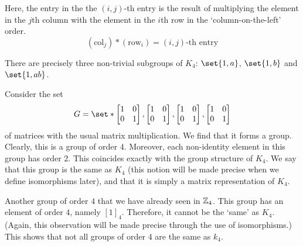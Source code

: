\documentclass[11pt]{penrose}
\begin{document}
Here, the entry in the the $(i,j)$-th entry is the result of multiplying the element in the $j$th column with the element in the $i$th row in the `column-on-the-left' order.
\begin{equation*}
    (\text{col}_j) * (\text{row}_i) = (i,j)\text{-th entry}
\end{equation*}

There are precisely three non-trivial subgroups of $K_4$: $\set{1, a}$, $\set{1, b}$ and $\set{1, ab}$.

Consider the set
\begin{equation*}
    G = \set*{
    \begin{bmatrix}1 & 0 \\ 0 & 1\end{bmatrix},
    \begin{bmatrix}1 & 0 \\ 0 & 1\end{bmatrix},
    \begin{bmatrix}1 & 0 \\ 0 & 1\end{bmatrix},
    \begin{bmatrix}1 & 0 \\ 0 & 1\end{bmatrix}}
\end{equation*}
of matrices with the usual matrix multiplication. We find that it forms a group. Clearly, this is a group of order $4$. Moreover, each non-identity element in this group has order $2$. This coincides exactly with the group structure of $K_4$. We say that this group is the same as $K_4$ (this notion will be made precise when we define isomorphisms later), and that it is simply a matrix representation of $K_4$.

Another group of order $4$ that we have already seen in $\mathbb{Z}_4$. This group has an element of order $4$, namely $[1]_4$. Therefore, it cannot be the `same' as $K_4$. (Again, this observation will be made precise through the use of isomorphisms.) This shows that not all groups of order $4$ are the same as $k_4$.
\end{document}
